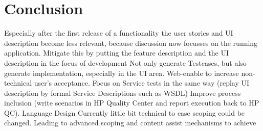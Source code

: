 \documentclass{sig-alternate-05-2015}
\begin{document}
\section{Conclusion}\label{sec:Conclusion} %
Especially after the first release of a functionality the user stories and UI description become less relevant, because discussion now focusses on the running application. Mitigate this by putting the feature description and the UI description in the focus of development 
Not only generate Testcases, but also generate implementation, especially in the UI area.
Web-enable to increase non-technical user’s acceptance. 
Focus on Service tests in the same way (replay UI description by formal Service Descriptions such as WSDL)
Improve process inclusion (write scenarios in HP Quality Center and report execution back to HP QC). 
Language Design Currently little bit technical to ease scoping could be changed. Leading to advanced scoping and content assist mechanisms to achieve 


%



%
%

\end{document}
